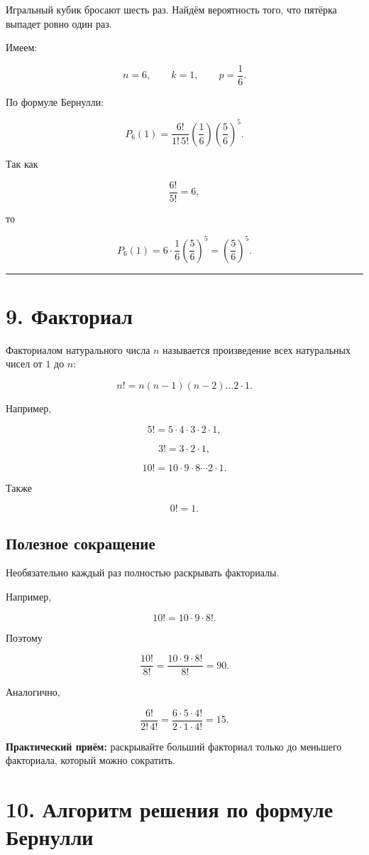 \documentclass[a4paper,12pt]{article}
\newcommand{\accentline}{%
    \par\noindent
    {\color{accent}\rule{\linewidth}{0.7pt}}
    \par
}
\newcommand{\key}[1]{\textbf{\color{darkaccent}#1}}
\begin{document}
Игральный кубик бросают шесть раз. Найдём вероятность того, что пятёрка выпадет ровно один раз.

Имеем:

\[
n=6,
\qquad
k=1,
\qquad
p=\frac16.
\]

По формуле Бернулли:

\[
P_6(1)
=
\frac{6!}{1!\,5!}
\left(\frac16\right)
\left(\frac56\right)^5.
\]

Так как

\[
\frac{6!}{5!}=6,
\]

то

\[
P_6(1)
=
6\cdot\frac16
\left(\frac56\right)^5
=
\left(\frac56\right)^5.
\]

\accentline

\section*{\color{darkaccent}9. Факториал}

Факториалом натурального числа $n$ называется произведение всех натуральных чисел от $1$ до $n$:

\[
n!=n(n-1)(n-2)\ldots 2\cdot1.
\]

Например,

\[
5!=5\cdot4\cdot3\cdot2\cdot1,
\]

\[
3!=3\cdot2\cdot1,
\]

\[
10!=10\cdot9\cdot8\cdots2\cdot1.
\]

Также

\[
0!=1.
\]

\subsection*{Полезное сокращение}

Необязательно каждый раз полностью раскрывать факториалы.

Например,

\[
10!
=
10\cdot9\cdot8!.
\]

Поэтому

\[
\frac{10!}{8!}
=
\frac{10\cdot9\cdot8!}{8!}
=
90.
\]

Аналогично,

\[
\frac{6!}{2!\,4!}
=
\frac{6\cdot5\cdot4!}{2\cdot1\cdot4!}
=
15.
\]

\key{Практический приём:} раскрывайте больший факториал только до меньшего факториала, который можно сократить.

\section*{\color{darkaccent}10. Алгоритм решения по формуле Бернулли}
\end{document}
